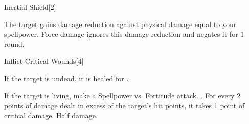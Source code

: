 \begin{spellsection}{Inertial Shield}[2]
    \begin{spellheader}
    \end{spellheader}
    \begin{spellcontent}
        \begin{spelltargetinginfo}
        \end{spelltargetinginfo}
        \begin{spelleffects}
            \spelleffect The target gains damage reduction against physical damage equal to your spellpower. Force damage ignores this damage reduction and negates it for 1 round.
            \spelldur \durshort
        \end{spelleffects}
    \end{spellcontent}
    \begin{spellfooter}
        \miscastexplode
    \end{spellfooter}
\end{spellsection}

\begin{spellsection}{Inflict Critical Wounds}[4]
    \begin{spellheader}
    \end{spellheader}
    \begin{spellcontent}
        \begin{spelltargetinginfo}
        \end{spelltargetinginfo}
        \begin{spelleffects}
            \spelleffect If the target is undead, it is healed for \spelldamage{}.
            \begin{spellattacktriggered}{If the target is living, make a Spellpower vs. Fortitude attack.}
                \spellsuccess {}. For every 2 points of damage dealt in excess of the target's hit points, it takes 1 point of critical damage.
                \spellfailure Half damage.
            \end{spellattacktriggered}
        \end{spelleffects}
    \end{spellcontent}
    \begin{spellfooter}
        \miscastrandom
    \end{spellfooter}
\end{spellsection}

